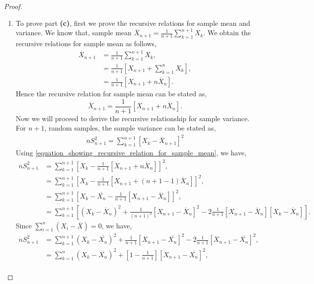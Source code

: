 \documentclass[a4paper,english,12pt]{article}
\begin{document}
\begin{proof}
\begin{enumerate}
\begin{lem}
\begin{enumerate}
\end{enumerate}
\end{lem}
\item To prove part \textbf{(c)}, first we prove the recursive relations for sample mean and variance. We know that, sample mean $\overline{X}_{n+1}=\frac{1}{n+1} \sum\limits_{k=1}^{n+1} X_{k}$. We obtain the recursive relations for sample mean as follows,
\begin{align}
\overline{X}_{n+1}& =\frac{1}{n+1} \sum\limits_{k=1}^{n+1} X_{k}, \nonumber \\
& = \frac{1}{n+1} [X_{n+1} + \sum\limits_{k=1}^{n} X_{k}], \nonumber \\
& = \frac{1}{n+1} [X_{n+1} + n\overline{X}_n]. \nonumber 
\end{align}
Hence the recursive relation for sample mean can be stated as,
\begin{equation} \label{equation_showing_recursive_relation_for_sample_mean}
\overline{X}_{n+1}= \frac{1}{n+1} [X_{n+1} + n\overline{X}_n].
\end{equation}
Now we will proceed to derive the recursive relationship for sample variance.\\
For $n+1$, random samples, the sample variance can be stated as,
\begin{align}
nS_{n+1} ^2=\sum\limits_{k=1}^{n+1} [X_{k}-\overline{X}_{n+1}]^2
\end{align}
Using \eqref{equation_showing_recursive_relation_for_sample_mean}, we have,
\begin{align}
nS_{n+1} ^2& =\sum\limits_{k=1}^{n+1} [X_{k}-\frac{1}{n+1} [X_{n+1} + n\overline{X}_n]]^2 , \nonumber \\
& =\sum\limits_{k=1}^{n+1} [X_{k}-\frac{1}{n+1} [X_{n+1} + (n+1-1)\overline{X}_n]]^2 , \nonumber \\
& =\sum\limits_{k=1}^{n+1} [X_{k}-\overline{X_n}-\frac{1}{n+1}[X_{n+1} - \overline{X}_n]]^2 , \nonumber \\
& =\sum\limits_{k=1}^{n+1} [(X_{k}-\overline{X}_n)^2+\frac{1}{(n+1)^2}[X_{n+1} - \overline{X}_n]^2-2 \frac{1}{n+1}[X_{n+1} - \overline{X}_n][X_{k}-\overline{X}_n]].
\end{align}
Since $\sum_{i=1}^n(X_i-\overline{X})=0$, we have,
\begin{align}
nS_{n+1} ^2&=\sum\limits_{k=1}^{n+1} (X_{k}-\overline{X_n})^2+\frac{1}{n+1}[X_{n+1} - \overline{X_n}]^2-2 \frac{1}{n+1}[X_{n+1} - \overline{X_n}]^2 , \nonumber \\
& =\sum\limits_{k=1}^{n} (X_{k}-\overline{X_n})^2+\left[1-\frac{1}{n+1}\right][X_{n+1} - \overline{X_n}]^2 , \nonumber \\

\end{align}
\end{enumerate}
\end{proof}
\end{document}

